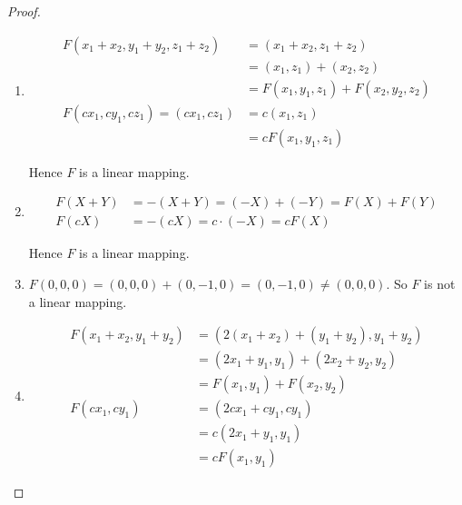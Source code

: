 \begin{proof}
    \begin{enumerate}[label={(\alph*)}]
        \item
              \begin{align*}
                  F(x_{1} + x_{2}, y_{1} + y_{2}, z_{1} + z_{2}) & = (x_{1} + x_{2}, z_{1} + z_{2})                  \\
                                                                 & = (x_{1}, z_{1}) + (x_{2}, z_{2})                 \\
                                                                 & = F(x_{1}, y_{1}, z_{1}) + F(x_{2}, y_{2}, z_{2}) \\
                  F(cx_{1}, cy_{1}, cz_{1}) = (cx_{1}, cz_{1})   & = c(x_{1}, z_{1})                                 \\
                                                                 & = cF(x_{1}, y_{1}, z_{1})
              \end{align*}

              Hence $F$ is a linear mapping.
        \item
              \begin{align*}
                  F(X + Y) & = -(X + Y) = (-X) + (-Y) = F(X) + F(Y) \\
                  F(cX)    & = -(cX) = c\cdot (-X) = cF(X)
              \end{align*}

              Hence $F$ is a linear mapping.
        \item $F(0, 0, 0) = (0, 0, 0) + (0, -1, 0) = (0, -1, 0) \ne (0, 0, 0)$. So $F$ is not a linear mapping.
        \item
              \begin{align*}
                  F(x_{1} + x_{2}, y_{1} + y_{2}) & = (2(x_{1} + x_{2}) + (y_{1} + y_{2}), y_{1} + y_{2}) \\
                                                  & = (2x_{1} + y_{1}, y_{1}) + (2x_{2} + y_{2}, y_{2})   \\
                                                  & = F(x_{1}, y_{1}) + F(x_{2}, y_{2})                   \\
                  F(cx_{1}, cy_{1})               & = (2cx_{1} + cy_{1}, cy_{1})                          \\
                                                  & = c(2x_{1} + y_{1}, y_{1})                            \\
                                                  & = cF(x_{1}, y_{1})
              \end{align*}


\end{enumerate}
\end{proof}
